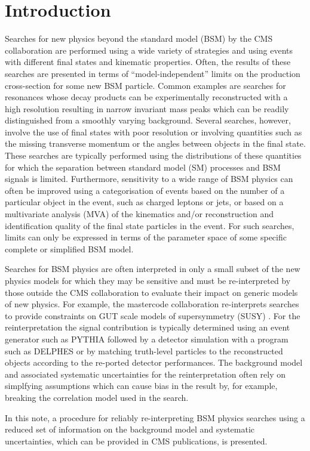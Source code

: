 \section{Introduction}
\label{sec:intro}

Searches for new physics beyond the standard model (BSM) by the CMS collaboration are performed using a wide variety of 
strategies and using events with different final states and kinematic properties.  Often, 
the results of these searches are presented in terms of ``model-independent'' limits on the production 
cross-section for some new BSM particle. Common examples are searches for resonances whose decay products 
can be experimentally reconstructed with a high resolution resulting in narrow invariant mass peaks which can be readily distinguished from 
a smoothly varying background. Several searches, however, involve the use of final states with poor resolution or involving 
quantities such as the missing transverse momentum or the angles between objects in the final state. These searches are typically performed using the 
distributions of these quantities for which the separation between standard model (SM) processes and BSM signals is limited. Furthermore, 
sensitivity to a wide range of BSM physics can often be improved using a categorisation of events based on the number of a particular 
object in the event, such as charged leptons or jets, or based on a multivariate analysis (MVA) of the kinematics and/or reconstruction and 
identification quality of the final state particles in the event. For such searches, limits can only be expressed in terms of the 
parameter space of some specific complete or simplified BSM model.

Searches for BSM physics are often interpreted in only a small subset of the new physics
models for which they may be sensitive and must be re-interpreted by those
outside the CMS collaboration to evaluate their impact on generic models of new physics.
For example, the mastercode collaboration re-interprets searches to provide constraints
on GUT scale models of supersymmetry (SUSY) \cite{mastercode}. For the reinterpretation the signal contribution 
is typically determined using an event generator such as PYTHIA \cite{pythia} followed by a detector
simulation with a program such as DELPHES \cite{delphes} or by matching truth-level particles to
the reconstructed objects according to the re-ported detector performances. 
The background model and associated systematic uncertainties for the reinterpretation often rely
on simplfying assumptions which can cause bias in the result by, for example, breaking the 
correlation model used in the search. 

In this note, a procedure for reliably re-interpreting BSM physics searches using a reduced set of information
 on the background model and systematic uncertainties, which can be provided in CMS publications, is presented.




